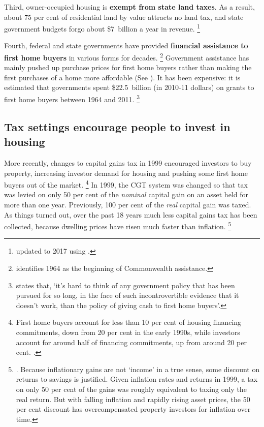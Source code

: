 Third, owner-occupied housing is \textbf{exempt from state land taxes}.
As a result, about 75 per cent of residential land by value attracts no land tax, and state government budgets forgo about \$7~billion a year in revenue.%
  \footnote{\textcite[][24]{KellyHarrisonHunterEtAl2013} updated to 2017 using \textcite[][Table~61]{ABS-aus-system-of-nat-accounts2016-17}.}

Fourth, federal and state governments have provided \textbf{financial assistance to first home buyers} in various forms for decades.%
    \footnote{\textcite{Eslake2013} identifies 1964 as the beginning of Commonwealth assistance.}
Government assistance has mainly pushed up purchase prices for first home buyers rather than making the first purchases of a home more affordable (See ). It has been expensive: it is estimated that governments spent \$22.5~billion (in 2010-11 dollars) on grants to first home buyers between 1964 and 2011.%
    \footnote{\textcite{Eslake2013} states that, `it's hard to think of any government policy that has been pursued for so long, in the face of such incontrovertible evidence that it doesn't work, than the policy of giving cash to first home buyers'.}

\subsection{Tax settings encourage people to invest in housing}\label{subsec:tax-settings-encourage-people-to-invest-in-housing}

More recently, changes to capital gains tax in 1999 encouraged investors to buy property, increasing investor demand for housing and pushing some first home buyers out of the market.%
    \footnote{First home buyers account for less than 10 per cent of housing financing commitments, down from 20 per cent in the early 1990s, while investors account for around half of financing commitments, up from around 20 per cent. \textcites{ABSHousingFinanceAustraliaAugust2017}{Eslake-2017-causes-effects-housing-affordability}.}
In 1999, the CGT system was changed so that tax was levied on only 50 per cent of the \emph{nominal} capital gain on an asset held for more than one year.
Previously, 100 per cent of the \emph{real} capital gain was taxed.
As things turned out, over the past 18 years much less capital gains tax has been collected, because dwelling prices have risen much faster than inflation.%
	\footnote{\textcite[][10]{DaleyWood2016-Negative-Gearing-CGT}. Because inflationary gains are not `income' in a true sense, some discount on returns to savings is justified. Given inflation rates and returns in 1999, a tax on only 50 per cent of the gains was roughly equivalent to taxing only the real return. But with falling inflation and rapidly rising asset prices, the 50 per cent discount has overcompensated property investors for inflation over time.}

